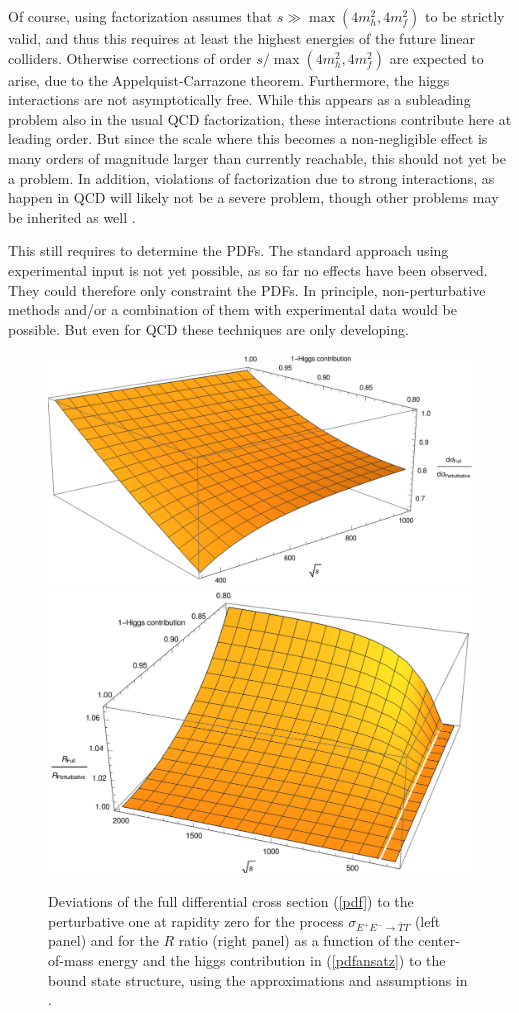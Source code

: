 \documentclass[final,12pt]{article}
\newcommand*{\pref}[1]{(\ref{#1})}
\newcommand*{\1}{1\!\!\!\bot}
\begin{document}
Of course, using factorization assumes that $s\gg\max(4m_h^2,4m_f^2)$ to be strictly valid, and thus this requires at least the highest energies of the future linear colliders. Otherwise corrections of order $s/\max(4m_h^2,4m_f^2)$ are expected to arise, due to the Appelquist-Carrazone theorem. Furthermore, the higgs interactions are not asymptotically free. While this appears as a subleading problem also in the usual QCD factorization, these interactions contribute here at leading order. But since the scale where this becomes a non-negligible effect is many orders of magnitude larger than currently reachable, this should not yet be a problem. In addition, violations of factorization due to strong interactions, as happen in QCD \cite{Brodsky:2010an} will likely not be a severe problem, though other problems may be inherited as well \cite{Baumgart:2018ntv}.

This still requires to determine the PDFs. The standard approach using experimental input \cite{Gao:2017yyd} is not yet possible, as so far no effects have been observed. They could therefore only constraint the PDFs. In principle, non-perturbative methods \cite{Nguyen:2011jy,Lin:2014zya,Chen:2016utp,Lin:2017snn} and/or a combination of them with experimental data \cite{Nocera:2017war,Lin:2017snn} would be possible. But even for QCD these techniques are only developing.

\begin{figure}
\includegraphics[width=0.5\linewidth]{enhancement}\includegraphics[width=0.5\linewidth]{rratio-all}
\caption{\label{fig:pdf}Deviations of the full differential cross section \pref{pdf} to the perturbative one at rapidity zero for the process $\sigma_{E^+E^-\to\bar{T}T}$ (left panel) and for the $R$ ratio (right panel) as a function of the center-of-mass energy and the higgs contribution in \pref{pdfansatz} to the bound state structure, using the approximations and assumptions in \cite{Egger:2017tkd,Maas:2017swq}.}
\end{figure}
\end{document}
